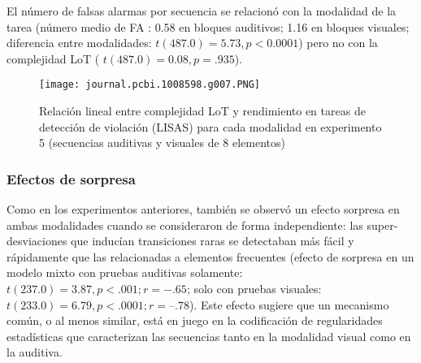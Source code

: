 El número de falsas alarmas por secuencia se relacionó con la modalidad de la tarea (número medio de FA : 0.58 en bloques auditivos; 1.16 en bloques visuales; diferencia entre modalidades: $t ( 487.0 ) = 5.73 , p <0.0001$) pero no con la complejidad LoT ( $t( 487.0 ) = 0.08, p =.935$).

\begin{figure}[t!]
      \texttt{[image: journal.pcbi.1008598.g007.PNG]}
      \centering
      \caption{Relación lineal entre complejidad LoT y rendimiento en tareas de detección de violación (LISAS) para cada modalidad en experimento 5 (secuencias auditivas y visuales de 8 elementos)}
      \label{PlosBIO-F7}
\end{figure}

\subsubsection{Efectos de sorpresa}


Como en los experimentos anteriores, también se observó un efecto sorpresa en ambas modalidades cuando se consideraron de forma independiente: las super-desviaciones que inducían transiciones raras se detectaban más fácil y rápidamente que las relacionadas a elementos frecuentes (efecto de sorpresa en un modelo mixto con pruebas auditivas solamente: $t(237.0) = 3.87, p <.001; r =- .65$; solo con pruebas visuales: $t (233.0) = 6.79, p <.0001; r = –.78$). Este efecto sugiere que un mecanismo común, o al menos similar, está en juego en la codificación de regularidades estadísticas que caracterizan las secuencias tanto en la modalidad visual como en la auditiva.


